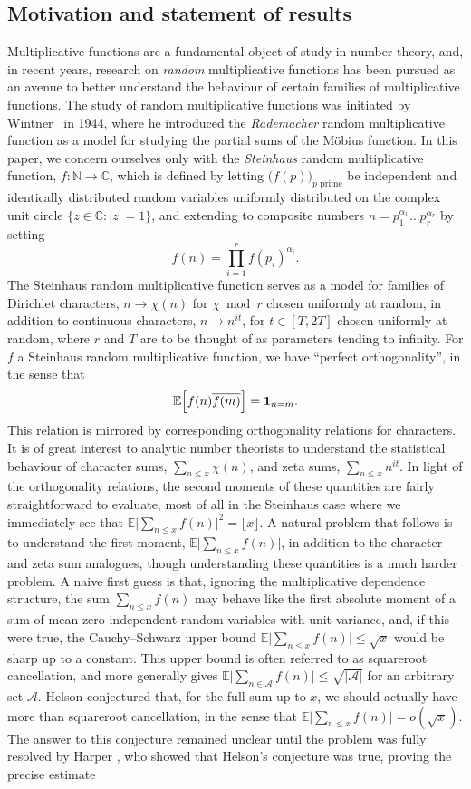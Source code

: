 \documentclass[12pt,a4paper,reqno]{amsart}
\numberwithin{equation}{section}
\def\C{\mathbb C}
\def\N{\mathbb N}
\def\E{\mathbb E}
\def\CA{\mathcal{A}}
\def\leq {\leqslant}
\theoremstyle{remark}
\theoremstyle{definition}
\numberwithin{equation}{section}
\theoremstyle{remark}
\def\E{\mathbb E}
\begin{document}
\subsection{Motivation and statement of results}
Multiplicative functions are a fundamental object of study in number theory, and, in recent years, research on \emph{random} multiplicative functions has been pursued as an avenue to better understand the behaviour of certain families of multiplicative functions. The study of random multiplicative functions was initiated by Wintner~\cite{Win} in 1944, where he introduced the \emph{Rademacher} random multiplicative function as a model for studying the partial sums of the Möbius function. In this paper, we concern ourselves only with the \emph{Steinhaus} random multiplicative function, $f \colon \N \rightarrow \C$, which is defined by letting $\bigl( f(p) \bigr)_{p \text{ prime}}$ be independent and identically distributed random variables uniformly distributed on the complex unit circle $\{ z \in \C : |z| = 1 \}$, and extending to composite numbers $n = p_1^{\alpha_1} \dots p_r^{\alpha_r}$ by setting 
\[
f(n) = \prod_{i=1}^r f(p_i)^{\alpha_i}.
\]
The Steinhaus random multiplicative function serves as a model for families of Dirichlet characters, $n \rightarrow \chi(n)$ for $\chi \bmod r$ chosen uniformly at random, in addition to continuous characters, $n \rightarrow n^{it}$, for $t \in [T,2T]$ chosen uniformly at random, where $r$ and $T$ are to be thought of as parameters tending to infinity. For $f$ a Steinhaus random multiplicative function, we have ``perfect orthogonality'', in the sense that
\[
\E \Bigl[ f(n) \overline{f(m)} \Bigr] = \mathbf{1}_{n=m} .
\]
This relation is mirrored by corresponding orthogonality relations for characters. It is of great interest to analytic number theorists to understand the statistical behaviour of character sums, $\sum_{n \leq x} \chi (n)$, and zeta sums, $\sum_{n \leq x} n^{it}$. In light of the orthogonality relations, the second moments of these quantities are fairly straightforward to evaluate, most of all in the Steinhaus case where we immediately see that $ \E \bigl| \sum_{n \leq x} f (n) \bigr|^2 = \lfloor x \rfloor$. A natural problem that follows is to understand the first moment, $\E \bigl| \sum_{n \leq x} f(n) \bigr|$, in addition to the character and zeta sum analogues, though understanding these quantities is a much harder problem. A naive first guess is that, ignoring the multiplicative dependence structure, the sum $\sum_{n \leq x} f(n)$ may behave like the first absolute moment of a sum of mean-zero independent random variables with unit variance, and, if this were true, the Cauchy--Schwarz upper bound $\E \bigl| \sum_{n \leq x} f(n) \bigr| \leq \sqrt{x}$ would be sharp up to a constant. This upper bound is often referred to as squareroot cancellation, and more generally gives $\E \bigl| \sum_{n \in \CA} f(n) \bigr| \leq \sqrt{|\CA|}$ for an arbitrary set $\CA$. Helson \cite{Helson} conjectured that, for the full sum up to $x$, we should actually have more than squareroot cancellation, in the sense that $\E \bigl| \sum_{n \leq x} f(n) \bigr| = o(\sqrt{x})$. The answer to this conjecture remained unclear until the problem was fully resolved by Harper \cite{HarperLow}, who showed that Helson's conjecture was true, proving the precise estimate
\end{document}
